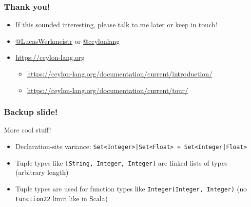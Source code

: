 \documentclass[aspectratio=169]{beamer}
\makeatletter
\newcommand{\TwitterUsername}[1]{\href{https://twitter.com/#1}{\ttfamily @#1}}
\makeatother
\begin{document}
\begin{frame}
  \frametitle{Thank you!}
  \begin{itemize}
  \item If this sounded interesting, please talk to me later or keep in touch!
  \item \TwitterUsername{LucasWerkmeistr} or \TwitterUsername{ceylonlang}
  \item \url{https://ceylon-lang.org}
    \begin{itemize}
    \item \url{https://ceylon-lang.org/documentation/current/introduction/}
    \item \url{https://ceylon-lang.org/documentation/current/tour/}
    \end{itemize}
  \end{itemize}
\end{frame}

\begin{frame}
  \frametitle{Backup slide!}
  More cool stuff!
  \begin{itemize}
  \item Declaration-site variance: \lstinline{Set<Integer>|Set<Float> = Set<Integer|Float>}
  \item Tuple types like \lstinline{[String, Integer, Integer]} are linked lists of types (arbitrary length)
  \item Tuple types are used for function types like \lstinline{Integer(Integer, Integer)} (no \lstinline{Function22} limit like in Scala)
  \end{itemize}
\end{frame}
\end{document}
